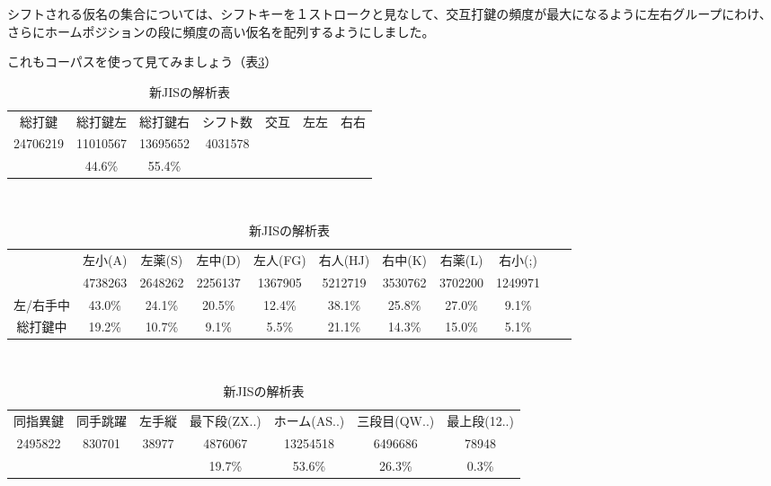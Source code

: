 シフトされる仮名の集合については、シフトキーを１ストロークと見なして、交互打鍵の頻度が最大になるように左右グループにわけ、さらにホームポジションの段に頻度の高い仮名を配列するようにしました。

これもコーパスを使って見てみましょう（表\ref{tbl:newjis}）

\begin{table}[htbp]
 \caption{新JISの解析表}
 \begin{center}
 \begin{tabular}{cccc|ccc}
 \hline
総打鍵 & 総打鍵左 & 総打鍵右 & シフト数 & 交互 & 左左 & 右右 \\
24706219 & 11010567 & 13695652 & 4031578\\
 & 44.6\% & 55.4\% & \\
 \hline
 \end{tabular}

 　\vspace{1zw}　

 \begin{tabular}{ccccccccccc}
 \hline
& 左小(A) & 左薬(S) & 左中(D) & 左人(FG) & 右人(HJ) & 右中(K) & 右薬(L) & 右小(;)\\
& 4738263 & 2648262 & 2256137 & 1367905 & 5212719 & 3530762 & 3702200 & 1249971\\
左/右手中 & 43.0\% & 24.1\% & 20.5\% & 12.4\% & 38.1\% & 25.8\% & 27.0\% & 9.1\%\\
総打鍵中 & 19.2\% & 10.7\% & 9.1\% & 5.5\% & 21.1\% & 14.3\% & 15.0\% & 5.1\%\\
\hline
 \end{tabular}

 　\vspace{1zw}　

 \begin{tabular}{ccc|cccc}
 \hline
 同指異鍵 & 同手跳躍 & 左手縦 & 最下段(ZX..) & ホーム(AS..) & 三段目(QW..) & 最上段(12..)\\
2495822 & 830701 & 38977 & 4876067 & 13254518 & 6496686 & 78948\\
 &  &  & 19.7\% & 53.6\% & 26.3\% & 0.3\%\\
\hline
 \end{tabular}
 \end{center}
 \label{tbl:newjis}
\end{table}




